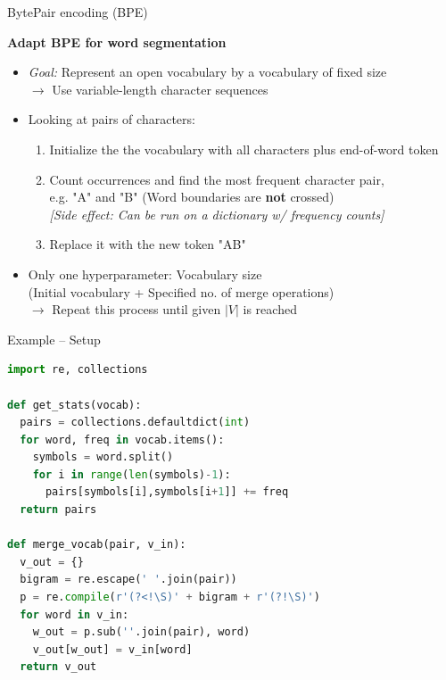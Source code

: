 \begin{vbframe}{BytePair encoding (BPE)}

\vfill

\textbf{Adapt BPE for word segmentation \href{https://www.aclweb.org/anthology/P16-1162.pdf}{}}

	\begin{itemize}
		\item \textit{Goal:} Represent an open vocabulary by a vocabulary of fixed size\\
					$\rightarrow$ Use variable-length character sequences 
		\item Looking at pairs of characters:
			\begin{enumerate}
				\item Initialize the the vocabulary with all characters plus end-of-word token
				\item Count occurrences and find the most frequent character pair,\\
							e.g. "A" and "B" (\warning Word boundaries are \textbf{not} crossed) \\
							\textit{[Side effect: Can be run on a dictionary w/ frequency counts]}
				\item Replace it with the new token "AB"
			\end{enumerate}
		\item Only one hyperparameter: Vocabulary size\\
					(Initial vocabulary + Specified no. of merge operations)\\
					$\rightarrow$ Repeat this process until given $|V|$ is reached
	\end{itemize}

\vfill

\end{vbframe}


\begin{vbframe}{Example -- Setup}

\begin{lstlisting}[language=Python]
import re, collections

def get_stats(vocab):
  pairs = collections.defaultdict(int)
  for word, freq in vocab.items():
    symbols = word.split()
    for i in range(len(symbols)-1):
      pairs[symbols[i],symbols[i+1]] += freq
  return pairs
	
def merge_vocab(pair, v_in):
  v_out = {}
  bigram = re.escape(' '.join(pair))
  p = re.compile(r'(?<!\S)' + bigram + r'(?!\S)')
  for word in v_in:
    w_out = p.sub(''.join(pair), word)
    v_out[w_out] = v_in[word]
  return v_out
\end{lstlisting}

\end{vbframe}

